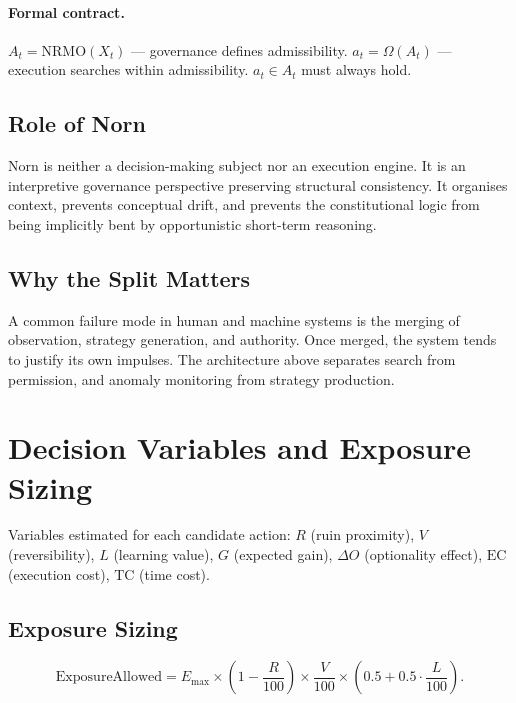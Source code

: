 \paragraph{Formal contract.}
$A_t = \mathrm{NRMO}(X_t)$ --- governance defines admissibility.
$a_t = \Omega(A_t)$ --- execution searches within admissibility.
$a_t \in A_t$ must always hold.

\subsection{Role of Norn}
\label{sec:omega-role-of-norn}

Norn is neither a decision-making subject nor an execution engine.
It is an interpretive governance perspective preserving structural
consistency. It organises context, prevents conceptual drift, and
prevents the constitutional logic from being implicitly bent by
opportunistic short-term reasoning.

\subsection{Why the Split Matters}
\label{sec:omega-split-rationale}

A common failure mode in human and machine systems is the merging
of observation, strategy generation, and authority. Once merged,
the system tends to justify its own impulses. The architecture above
separates search from permission, and anomaly monitoring from
strategy production.

\section{Decision Variables and Exposure Sizing}
\label{sec:omega-decision-vars}

Variables estimated for each candidate action: $R$ (ruin proximity),
$V$ (reversibility), $L$ (learning value), $G$ (expected gain),
$\Delta O$ (optionality effect), $\mathrm{EC}$ (execution cost),
$\mathrm{TC}$ (time cost).

\subsection{Exposure Sizing}
\label{sec:omega-exposure-sizing}

\begin{equation}
\mathrm{ExposureAllowed} = E_{\max} \times
\!\left(1 - \frac{R}{100}\right) \times
\frac{V}{100} \times
\!\left(0.5 + 0.5 \cdot \frac{L}{100}\right).
\label{eq:omega-exposure-sizing}
\end{equation}

